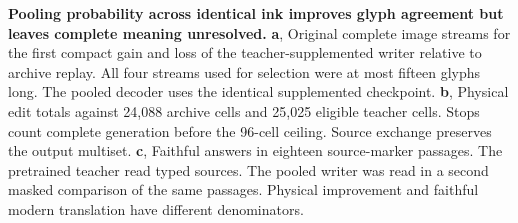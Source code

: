 \textbf{Pooling probability across identical ink improves glyph agreement but leaves complete meaning unresolved.} \textbf{a}, Original complete image streams for the first compact gain and loss of the teacher-supplemented writer relative to archive replay. All four streams used for selection were at most fifteen glyphs long. The pooled decoder uses the identical supplemented checkpoint. \textbf{b}, Physical edit totals against 24,088 archive cells and 25,025 eligible teacher cells. Stops count complete generation before the 96-cell ceiling. Source exchange preserves the output multiset. \textbf{c}, Faithful answers in eighteen source-marker passages. The pretrained teacher read typed sources. The pooled writer was read in a second masked comparison of the same passages. Physical improvement and faithful modern translation have different denominators.
